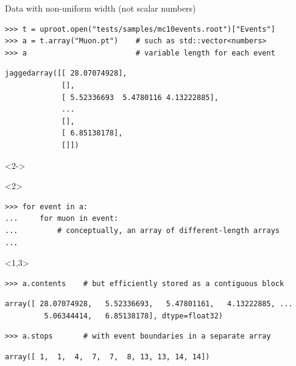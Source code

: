\documentclass[aspectratio=169]{beamer}
\begin{document}
\begin{frame}[fragile]{Data with non-uniform width (not scalar numbers)}
\vspace{0.1 cm}
\small
\begin{verbatim}
>>> t = uproot.open("tests/samples/mc10events.root")["Events"]
>>> a = t.array("Muon.pt")    # such as std::vector<numbers>
>>> a                         # variable length for each event
\end{verbatim}
\begin{verbatim}
jaggedarray([[ 28.07074928],
             [],
             [ 5.52336693  5.4780116 4.13222885],
             ...
             [],
             [ 6.85138178],
             []])
\end{verbatim}
\begin{uncoverenv}<2->
\begin{onlyenv}<2>
\begin{verbatim}
>>> for event in a:
...     for muon in event:
...         # conceptually, an array of different-length arrays
...
\end{verbatim}
\vspace{2 cm}
\end{onlyenv}
\begin{onlyenv}<1,3>
\begin{verbatim}
>>> a.contents    # but efficiently stored as a contiguous block
\end{verbatim}
\begin{verbatim}
array([ 28.07074928,   5.52336693,   5.47801161,   4.13222885, ...
         5.06344414,   6.85138178], dtype=float32)
\end{verbatim}
\begin{verbatim}
>>> a.stops       # with event boundaries in a separate array
\end{verbatim}
\begin{verbatim}
array([ 1,  1,  4,  7,  7,  8, 13, 13, 14, 14])
\end{verbatim}
\end{onlyenv}
\end{uncoverenv}
\end{frame}
\end{document}
